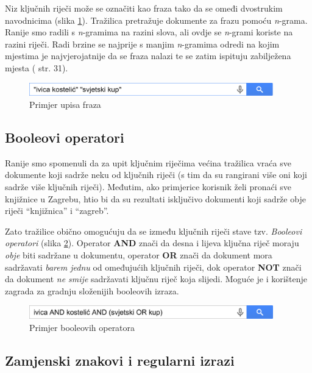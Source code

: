 \documentclass[a4paper,twoside,12pt]{scrreprt}
\begin{document}
Niz ključnih riječi može se označiti kao fraza tako da se omeđi dvostrukim navodnicima (slika \ref{phrases}). Tražilica pretražuje dokumente za frazu pomoću \textit{n}-grama. Ranije smo radili s \textit{n}-gramima na razini slova, ali ovdje se \textit{n}-grami koriste na razini riječi. Radi brzine se najprije s manjim \textit{n}-gramima odredi na kojim mjestima je najvjerojatnije da se fraza nalazi te se zatim ispituju zabilježena mjesta (\cite{taming} str. 31).

\begin{figure}[H]
  \centering
  \includegraphics[width=300pt]{phrases}
  \caption{Primjer upisa fraza}
  \label{phrases}
\end{figure}

\subsection{Booleovi operatori}

Ranije smo spomenuli da za upit ključnim riječima većina tražilica vraća sve dokumente koji sadrže neku od ključnih riječi (s tim da su rangirani više oni koji sadrže više ključnih riječi). Međutim, ako primjerice korisnik želi pronaći sve knjižnice u Zagrebu, htio bi da su rezultati isključivo dokumenti koji sadrže obje riječi ``knjižnica'' i ``zagreb''.

Zato tražilice obično omogućuju da se između ključnih riječi stave tzv. \textit{Booleovi operatori} (slika \ref{boolean}). Operator \textbf{AND} znači da desna i lijeva ključna riječ moraju \textit{obje} biti sadržane u dokumentu, operator \textbf{OR} znači da dokument mora sadržavati \textit{barem jednu} od omeđujućih ključnih riječi, dok operator \textbf{NOT} znači da dokument \textit{ne smije} sadržavati ključnu riječ koja slijedi. Moguće je i korištenje zagrada za gradnju složenijih booleovih izraza.

\begin{figure}[H]
  \centering
  \includegraphics[width=300pt]{boolean}
  \caption{Primjer booleovih operatora}
  \label{boolean}
\end{figure}

\subsection{Zamjenski znakovi i regularni izrazi}
\end{document}
